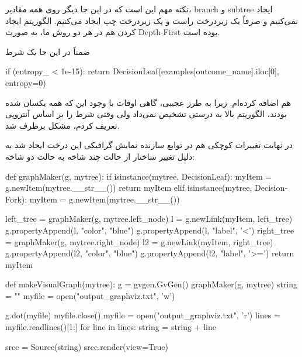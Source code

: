 \documentclass[12pt,titlepage,a4page , tikz , multi,table , svgnames,xcdraw]{article}
\begin{document}
نکته مهم این است که در این جا دیگر روی همه مقادیر، branch و subtree ایجاد نمی‌کنیم و صرفاً یک زیردرخت راست و یک زیردرخت چپ ایجاد می‌کنیم. الگوریتم ایجاد کردن هم در هر دو روش ما، به صورت Depth-First بوده است.

ضمناً در این جا یک شرط

\begin{latin}
\begin{python}[language=Python]

    if (entropy_ < 1e-15):
        return DecisionLeaf(examples[outcome_name].iloc[0], entropy=0)
\end{python}

\end{latin} 

هم اضافه کرده‌ام. زیرا به طرز عجیبی، گاهی اوقات با وجود این که همه یکسان شده بودند، الگوریتم بالا به درستی تشخیص نمی‌داد ولی وقتی شرط را بر اساس آنتروپی تعریف کردم، مشکل برطرف شد.


در نهایت تغییرات کوچکی هم در توابع سازنده نمایش گرافیکی این درخت ایجاد شد به دلیل تغییر ساختار از حالت چند شاخه به حالت دو شاخه:



\begin{latin}
\begin{python}[language=Python]

   def graphMaker(g, mytree):
    if isinstance(mytree, DecisionLeaf):
        myItem = g.newItem(mytree.__str__())
        return myItem
    elif isinstance(mytree, DecisionFork):
        myItem = g.newItem(mytree.__str__())

        left_tree = graphMaker(g, mytree.left_node)
        l = g.newLink(myItem, left_tree)
        g.propertyAppend(l, "color", "blue")
        g.propertyAppend(l, "label", '<')
        right_tree = graphMaker(g, mytree.right_node)
        l2 = g.newLink(myItem, right_tree)
        g.propertyAppend(l2, "color", "blue")
        g.propertyAppend(l2, "label", '>=')
    return myItem


def makeVisualGraph(mytree):
    g = gvgen.GvGen()
    graphMaker(g, mytree)
    string = ""
    myfile = open("output_graphviz.txt", 'w')

    g.dot(myfile)
    myfile.close()
    myfile = open("output_graphviz.txt", 'r')
    lines = myfile.readlines()[1:]
    for line in lines:
        string = string + line

    srcc = Source(string)
    srcc.render(view=True)
\end{python}

\end{latin} 
\end{document}

